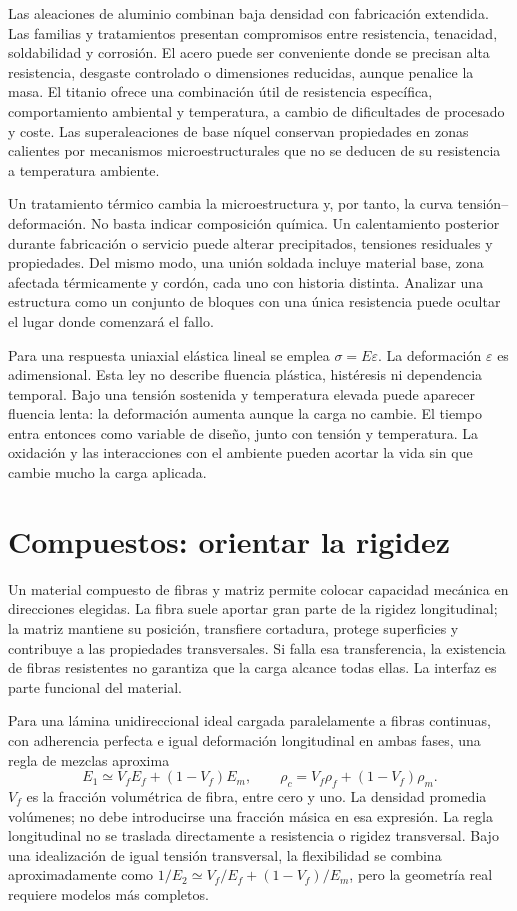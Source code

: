 Las aleaciones de aluminio combinan baja densidad con fabricación extendida. Las familias y tratamientos presentan compromisos entre resistencia, tenacidad, soldabilidad y corrosión. El acero puede ser conveniente donde se precisan alta resistencia, desgaste controlado o dimensiones reducidas, aunque penalice la masa. El titanio ofrece una combinación útil de resistencia específica, comportamiento ambiental y temperatura, a cambio de dificultades de procesado y coste. Las superaleaciones de base níquel conservan propiedades en zonas calientes por mecanismos microestructurales que no se deducen de su resistencia a temperatura ambiente.

Un tratamiento térmico cambia la microestructura y, por tanto, la curva tensión--deformación. No basta indicar composición química. Un calentamiento posterior durante fabricación o servicio puede alterar precipitados, tensiones residuales y propiedades. Del mismo modo, una unión soldada incluye material base, zona afectada térmicamente y cordón, cada uno con historia distinta. Analizar una estructura como un conjunto de bloques con una única resistencia puede ocultar el lugar donde comenzará el fallo.

Para una respuesta uniaxial elástica lineal se emplea $\sigma=E\varepsilon$. La deformación $\varepsilon$ es adimensional. Esta ley no describe fluencia plástica, histéresis ni dependencia temporal. Bajo una tensión sostenida y temperatura elevada puede aparecer fluencia lenta: la deformación aumenta aunque la carga no cambie. El tiempo entra entonces como variable de diseño, junto con tensión y temperatura. La oxidación y las interacciones con el ambiente pueden acortar la vida sin que cambie mucho la carga aplicada.

\section{Compuestos: orientar la rigidez}
Un material compuesto de fibras y matriz permite colocar capacidad mecánica en direcciones elegidas. La fibra suele aportar gran parte de la rigidez longitudinal; la matriz mantiene su posición, transfiere cortadura, protege superficies y contribuye a las propiedades transversales. Si falla esa transferencia, la existencia de fibras resistentes no garantiza que la carga alcance todas ellas. La interfaz es parte funcional del material.

Para una lámina unidireccional ideal cargada paralelamente a fibras continuas, con adherencia perfecta e igual deformación longitudinal en ambas fases, una regla de mezclas aproxima
\begin{equation}
 E_1\simeq V_fE_f+(1-V_f)E_m,\qquad
 \rho_c=V_f\rho_f+(1-V_f)\rho_m.
\end{equation}
$V_f$ es la fracción volumétrica de fibra, entre cero y uno. La densidad promedia volúmenes; no debe introducirse una fracción másica en esa expresión. La regla longitudinal no se traslada directamente a resistencia o rigidez transversal. Bajo una idealización de igual tensión transversal, la flexibilidad se combina aproximadamente como $1/E_2\simeq V_f/E_f+(1-V_f)/E_m$, pero la geometría real requiere modelos más completos.

